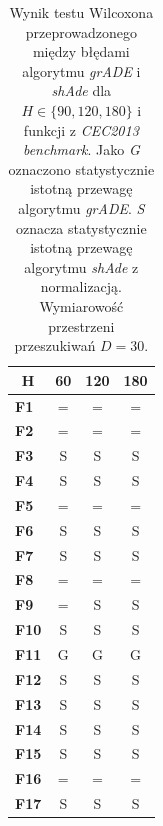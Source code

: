 \documentclass[12pt,a4paper]{report}
\begin{document}
{{{{{{{\begin{table}[]
\centering
\caption{Wynik testu Wilcoxona przeprowadzonego między błędami algorytmu \emph{grADE} i \emph{shAde} dla $H \in \{90, 120, 180\}$ i funkcji z \emph{CEC2013 benchmark}. Jako \emph{G} oznaczono statystycznie istotną przewagę algorytmu \emph{grADE}. \emph{S} oznacza statystycznie istotną przewagę algorytmu \emph{shAde} z normalizacją. Wymiarowość przestrzeni przeszukiwań $D = 30$.}
\label{Anal14}
\begin{tabular}{|l|c|c|c|}
\hline
\multicolumn{1}{|c|}{{\bf H}} & {\bf 60} & {\bf 120} & {\bf 180} \\ \hline
{\bf F1}                      & =        & =         & =         \\ \hline
{\bf F2}                      & =        & =         & =         \\ \hline
{\bf F3}                      & S        & S         & S         \\ \hline
{\bf F4}                      & S        & S         & S         \\ \hline
{\bf F5}                      & =        & =         & =         \\ \hline
{\bf F6}                      & S        & S         & S         \\ \hline
{\bf F7}                      & S        & S         & S         \\ \hline
{\bf F8}                      & =        & =         & =         \\ \hline
{\bf F9}                      & =        & S         & S         \\ \hline
{\bf F10}                     & S        & S         & S         \\ \hline
{\bf F11}                     & G        & G         & G         \\ \hline
{\bf F12}                     & S        & S         & S         \\ \hline
{\bf F13}                     & S        & S         & S         \\ \hline
{\bf F14}                     & S        & S         & S         \\ \hline
{\bf F15}                     & S        & S         & S         \\ \hline
{\bf F16}                     & =        & =         & =         \\ \hline
{\bf F17}                     & S        & S         & S         \\ \hline

\end{tabular}
\end{table}}}}}}}}
\end{document}
